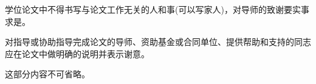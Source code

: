 
\begin{thanks}
	学位论文中不得书写与论文工作无关的人和事(可以写家人)，对导师的致谢要实事求是。\par
	对指导或协助指导完成论文的导师、资助基金或合同单位、提供帮助和支持的同志应在论文中做明确的说明并表示谢意。\par
	这部分内容不可省略。\par
\end{thanks}

